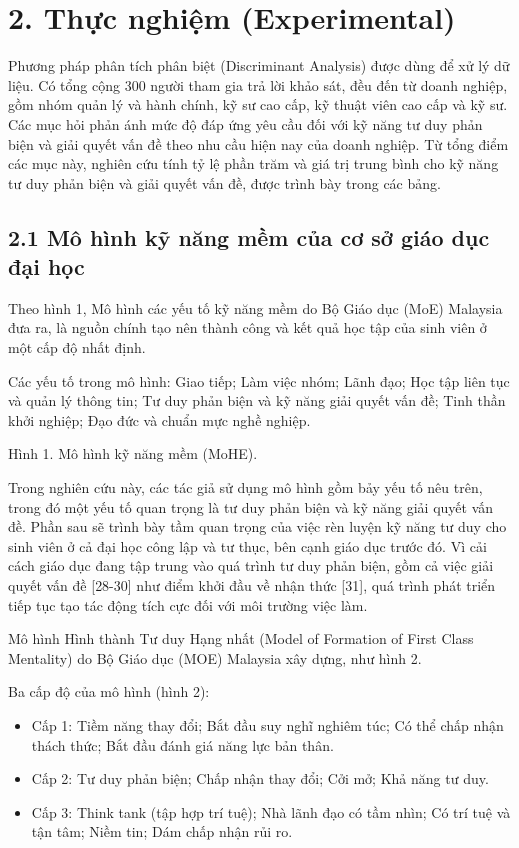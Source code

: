 \section{2. Thực nghiệm (Experimental)}

Phương pháp phân tích phân biệt (Discriminant Analysis) được dùng để xử lý dữ liệu. Có tổng cộng 300 người tham gia trả lời khảo sát, đều đến từ doanh nghiệp, gồm nhóm quản lý và hành chính, kỹ sư cao cấp, kỹ thuật viên cao cấp và kỹ sư. Các mục hỏi phản ánh mức độ đáp ứng yêu cầu đối với kỹ năng tư duy phản biện và giải quyết vấn đề theo nhu cầu hiện nay của doanh nghiệp. Từ tổng điểm các mục này, nghiên cứu tính tỷ lệ phần trăm và giá trị trung bình cho kỹ năng tư duy phản biện và giải quyết vấn đề, được trình bày trong các bảng.

\subsection{2.1 Mô hình kỹ năng mềm của cơ sở giáo dục đại học}

Theo hình 1, Mô hình các yếu tố kỹ năng mềm do Bộ Giáo dục (MoE) Malaysia đưa ra, là nguồn chính tạo nên thành công và kết quả học tập của sinh viên ở một cấp độ nhất định.

Các yếu tố trong mô hình: Giao tiếp; Làm việc nhóm; Lãnh đạo; Học tập liên tục và quản lý thông tin; Tư duy phản biện và kỹ năng giải quyết vấn đề; Tinh thần khởi nghiệp; Đạo đức và chuẩn mực nghề nghiệp.

Hình 1. Mô hình kỹ năng mềm (MoHE).

Trong nghiên cứu này, các tác giả sử dụng mô hình gồm bảy yếu tố nêu trên, trong đó một yếu tố quan trọng là tư duy phản biện và kỹ năng giải quyết vấn đề. Phần sau sẽ trình bày tầm quan trọng của việc rèn luyện kỹ năng tư duy cho sinh viên ở cả đại học công lập và tư thục, bên cạnh giáo dục trước đó. Vì cải cách giáo dục đang tập trung vào quá trình tư duy phản biện, gồm cả việc giải quyết vấn đề {[}28-30{]} như điểm khởi đầu về nhận thức {[}31{]}, quá trình phát triển tiếp tục tạo tác động tích cực đối với môi trường việc làm.

Mô hình Hình thành Tư duy Hạng nhất (Model of Formation of First Class Mentality) do Bộ Giáo dục (MOE) Malaysia xây dựng, như hình 2.

Ba cấp độ của mô hình (hình 2):

\begin{itemize}
\item
  Cấp 1: Tiềm năng thay đổi; Bắt đầu suy nghĩ nghiêm túc; Có thể chấp nhận thách thức; Bắt đầu đánh giá năng lực bản thân.
\item
  Cấp 2: Tư duy phản biện; Chấp nhận thay đổi; Cởi mở; Khả năng tư duy.
\item
  Cấp 3: Think tank (tập hợp trí tuệ); Nhà lãnh đạo có tầm nhìn; Có trí tuệ và tận tâm; Niềm tin; Dám chấp nhận rủi ro.
\end{itemize}

